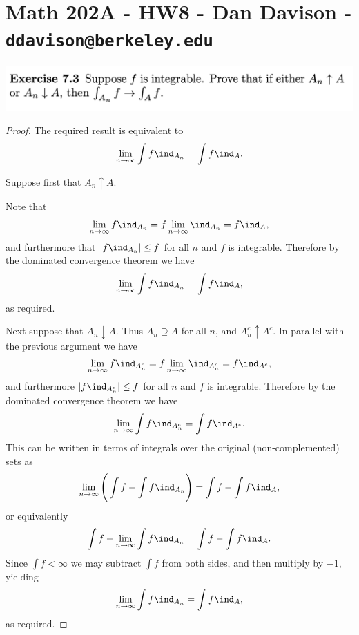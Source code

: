 \section*{Math 202A - HW8 - Dan Davison - \texttt{ddavison@berkeley.edu}}
\begin{mdframed}
\includegraphics[width=400pt]{img/analysis--berkeley-202a-hw08-2798.png}
\end{mdframed}

\begin{proof}
  The required result is equivalent to
  \begin{align*}
    \limn \int f \ind_{A_n} = \int f \ind_A.
  \end{align*}

  Suppose first that $A_n \uparrow A$.

  Note that
  \begin{align*}
    \limn f\ind_{A_n} = f\limn\ind_{A_n} = f\ind_A,
  \end{align*}
  and furthermore that $|f\ind_{A_n}| \leq f$ for all $n$ and $f$ is integrable. Therefore by the dominated
  convergence theorem we have
  \begin{align*}
    \limn \int f \ind_{A_n} = \int f \ind_A,
  \end{align*}
  as required.

  Next suppose that $A_n \downarrow A$. Thus $A_n \supseteq A$ for all $n$, and $A_n^c \uparrow A^c$. In
  parallel with the previous argument we have
  \begin{align*}
    \limn f\ind_{A_n^c} = f\limn\ind_{A_n^c} = f\ind_{A^c},
  \end{align*}
  and furthermore $|f\ind_{A_n^c}| \leq f$ for all $n$ and $f$ is integrable.  Therefore by the dominated
  convergence theorem we have
  \begin{align*}
    \limn \int f \ind_{A_n^c} = \int f \ind_{A^c}.
  \end{align*}
  This can be written in terms of integrals over the original (non-complemented) sets as
  \begin{align*}
    \limn \Bigg(\int f - \int f \ind_{A_n}\Bigg) = \int f - \int f \ind_{A},
  \end{align*}
  or equivalently
  \begin{align*}
    \int f - \limn \int f \ind_{A_n} = \int f - \int f \ind_{A}.
  \end{align*}
  Since $\int f < \infty$ we may subtract $\int f$ from both sides, and then multiply by $-1$, yielding
  \begin{align*}
    \limn \int f \ind_{A_n} = \int f \ind_{A},
  \end{align*}
  as required.
\end{proof}

